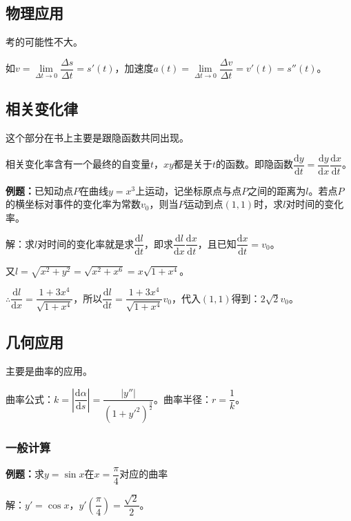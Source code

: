 \subsection{物理应用}

考的可能性不大。

如$v=\lim\limits_{\Delta t\to0}\dfrac{\Delta s}{\Delta t}=s'(t)$，加速度$a(t)=\lim\limits_{\Delta t\to0}\dfrac{\Delta v}{\Delta t}=v'(t)=s''(t)$。

\subsection{相关变化律}

这个部分在书上主要是跟隐函数共同出现。

相关变化率含有一个最终的自变量$t$，$xy$都是关于$t$的函数。即隐函数$\dfrac{\textrm{d}y}{\textrm{d}t}=\dfrac{\textrm{d}y}{\textrm{d}x}\dfrac{\textrm{d}x}{\textrm{d}t}$。

\textbf{例题：}已知动点$P$在曲线$y=x^3$上运动，记坐标原点与点$P$之间的距离为$l$。若点$P$的横坐标对事件的变化率为常数$v_0$，则当$P$运动到点$(1,1)$时，求$l$对时间的变化率。

解：求$l$对时间的变化率就是求$\dfrac{\textrm{d}l}{\textrm{d}t}$，即求$\dfrac{\textrm{d}l}{\textrm{d}x}\dfrac{\textrm{d}x}{\textrm{d}t}$，且已知$\dfrac{\textrm{d}x}{\textrm{d}t}=v_0$。

又$l=\sqrt{x^2+y^2}=\sqrt{x^2+x^6}=x\sqrt{1+x^4}$。

$\therefore\dfrac{\textrm{d}l}{\textrm{d}x}=\dfrac{1+3x^4}{\sqrt{1+x^4}}$，所以$\dfrac{\textrm{d}l}{\textrm{d}t}=\dfrac{1+3x^4}{\sqrt{1+x^4}}v_0$，代入$(1,1)$得到：$2\sqrt{2}v_0$。

\subsection{几何应用}

主要是曲率的应用。

曲率公式：$k=\left\lvert\dfrac{\textrm{d}\alpha}{\textrm{d}s}\right\rvert=\dfrac{\vert y''\vert}{(1+y'^2)^{\frac{3}{2}}}$。曲率半径：$r=\dfrac{1}{k}$。

\subsubsection{一般计算}

\textbf{例题：}求$y=\sin x$在$x=\dfrac{\pi}{4}$对应的曲率

解：$y'=\cos x$，$y'(\dfrac{\pi}{4})=\dfrac{\sqrt{2}}{2}$。

